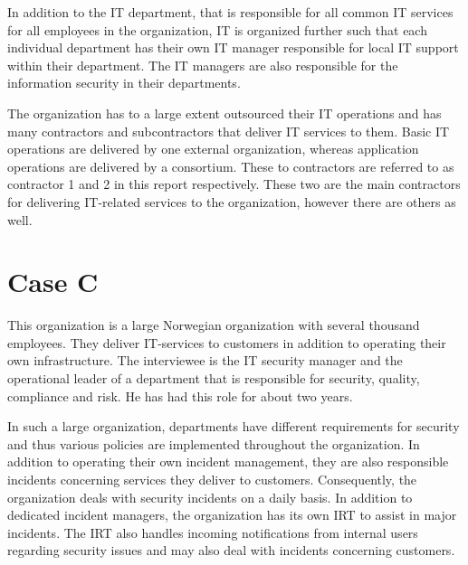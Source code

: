 In addition to the IT department, that is responsible for all common IT services for all employees in the organization, IT is organized further such that each individual department has their own IT manager responsible for local IT support within their department. The IT managers are also responsible for the information security in their departments.

The organization has to a large extent outsourced their IT operations and has    many contractors and subcontractors that deliver IT services to them. Basic IT operations are delivered by one external organization, whereas application operations are delivered by a consortium. These to contractors are referred to as contractor 1 and 2 in this report respectively. These two are the main contractors for delivering IT-related services to the organization, however there are others as well. 


\section{Case C}
This organization is a large Norwegian organization with several thousand employees. They deliver IT-services to customers in addition to operating their own infrastructure. The interviewee is the IT security manager  and the operational leader of a department that is responsible for security, quality, compliance and risk. He has had this role for about two years.

In such a large organization, departments have different requirements for security and thus various policies are implemented throughout the organization. In addition to operating their own incident management, they are also responsible incidents concerning services they deliver to customers. Consequently, the organization deals with security incidents on a daily basis. In addition to dedicated incident managers, the organization has its own \ac{IRT} to assist in major incidents. The \ac{IRT} also handles incoming notifications from internal users regarding security issues and may also deal with incidents concerning customers. 